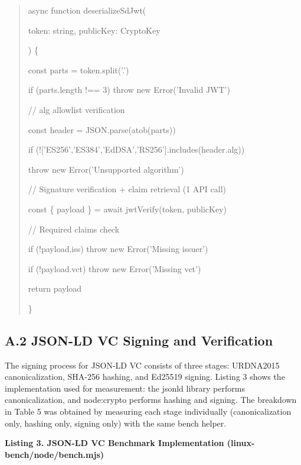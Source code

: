 \documentclass[conference]{IEEEtran}
\begin{document}
\begin{quote}
async function deserializeSdJwt(

token: string, publicKey: CryptoKey

) \{

const parts = token.split('.')

if (parts.length !== 3) throw new Error('Invalid JWT')

// alg allowlist verification

const header = JSON.parse(atob(parts\cite{ref0}))

if (!{[}'ES256','ES384','EdDSA','RS256'{]}.includes(header.alg))

throw new Error('Unsupported algorithm')

// Signature verification + claim retrieval (1 API call)

const \{ payload \} = await jwtVerify(token, publicKey)

// Required claims check

if (!payload.iss) throw new Error('Missing issuer')

if (!payload.vct) throw new Error('Missing vct')

return payload

\}
\end{quote}

\subsection*{A.2 JSON-LD VC Signing and Verification}

The signing process for JSON-LD VC consists of three stages: URDNA2015 canonicalization, SHA-256 hashing, and Ed25519 signing. Listing 3 shows the implementation used for measurement: the jsonld library performs canonicalization, and node:crypto performs hashing and signing. The breakdown in Table 5 was obtained by measuring each stage individually (canonicalization only, hashing only, signing only) with the same bench helper.

\textbf{Listing 3. JSON-LD VC Benchmark Implementation (linux-bench/node/bench.mjs)}
\end{document}
